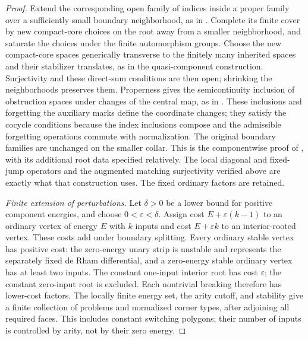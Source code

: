 \documentclass[11pt]{article}
\numberwithin{equation}{section}
\theoremstyle{definition}
\theoremstyle{remark}
\begin{document}
\begin{proof}
Extend the corresponding open family of indices inside a proper
family over a sufficiently small boundary neighborhood, as in
\cite[Proposition~8.18]{Floer:DisksII}.  Complete its finite cover
by new compact-core choices on the root away from a smaller
neighborhood, and saturate the choices under the finite
automorphism groups.  Choose the new compact-core spaces generically
transverse to the finitely many inherited spaces and their
stabilizer translates, as in the quasi-component construction.
Surjectivity and these direct-sum conditions are then open;
shrinking the neighborhoods preserves them.
Properness gives the semicontinuity inclusion of obstruction
spaces under changes of the central map, as in
\cite[Proposition~8.17]{Floer:DisksII}.  These inclusions and
forgetting the auxiliary marks define the coordinate changes;
they satisfy the cocycle conditions because the index inclusions
compose and the admissible forgetting operations commute with
normalization.  The original boundary families are unchanged on
the smaller collar.  This is the componentwise proof of
\cite[Theorems~5.3 and~5.4]{Floer:DisksII}, with its additional root
data specified relatively.  The local diagonal and fixed-jump
operators and the augmented matching surjectivity verified above
are exactly what that construction uses.  The fixed ordinary
factors are retained.

\emph{Finite extension of perturbations.}
Let $\delta>0$ be a lower bound for positive component energies,
and choose $0<\varepsilon<\delta$.  Assign cost
$E+\varepsilon(k-1)$ to an ordinary vertex of energy $E$ with $k$
inputs and cost $E+\varepsilon k$ to an interior-rooted vertex.
These costs add under boundary splitting.  Every ordinary stable
vertex has positive cost: the zero-energy unary strip is unstable
and represents the separately fixed de Rham differential, and a
zero-energy stable ordinary vertex has at least two inputs.  The
constant one-input interior root has cost $\varepsilon$; the
constant zero-input root is excluded.  Each nontrivial breaking
therefore has lower-cost factors.  The locally finite energy set,
the arity cutoff, and stability give a finite collection of
problems and normalized corner types, after adjoining all required
faces.  This includes constant switching polygons; their number of
inputs is controlled by arity, not by their zero energy.


\end{proof}
\end{document}
